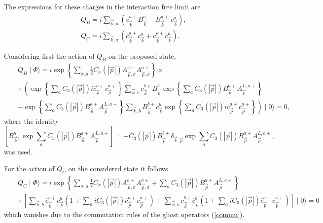 \documentclass[12pt,letterpaper]{report}
\begin{document}
The expressions for these charges in the interaction free limit
\cite{OjimaTex} are
\begin{eqnarray}
&&Q_B=i\sum\limits_{\vec{k},a}\left(
c_{\vec{k}}^{a+}B_{\vec{k}}^a-B_{\vec{k} }^{a+\
}c_{\vec{k}}^a\right), \nonumber \\
&&Q_C=i\sum\limits_{\vec{k},a}\left(
\overline{c}_{\vec{k}}^{a+}c_{\vec{k}
}^a+c_{\vec{k}}^{a+}\overline{c}_{\vec{k}}^a\right).
\end{eqnarray}

Considering first the action of $Q_B$ on the proposed state,
{\setlength\arraycolsep{0.5pt}
\begin{eqnarray}
&&Q_B\mid \Phi \rangle =i\exp \left\{ \sum\limits_{\sigma,a}\frac
12C_\sigma \left(\left| \vec{p}\right| \right) A_{\vec{p},\sigma
}^{a+}A_{\vec{p},\sigma }^{a+}\right\} \times \nonumber \\
&&\times \left(\exp \left\{ \sum\limits_aC_3\left(\left|
\vec{p}\right| \right)
i\overline{c}_{\vec{p}}^{a+}c_{\vec{p}}^{a+}\right\} \sum\limits_{
\vec{k},b}c_{\vec{k}}^{b+}B_{\vec{k}}^b\exp \left\{
\sum\limits_aC_3\left(\left| \vec{p}\right| \right)
B_{\vec{p}}^{a+}A_{\vec{p}}^{L,a+}\right\} \right. \\ &&-\left.
\exp \left\{ \sum\limits_aC_3\left(\left| \vec{p}\right| \right)
B_{\vec{p}}^{a+}A_{\vec{p}}^{L,a+}\right\}
\sum\limits_{\vec{k},b}B_{\vec{k} }^{b+}c_{\vec{k}}^b\exp \left\{
\sum\limits_aC_3\left(\left| \vec{p}\right| \right)
i\overline{c}_{\vec{p}}^{a+}c_{\vec{p}}^{a+}\right\} \right) \mid
0\rangle =0, \nonumber
\end{eqnarray}
}where the identity
\begin{equation}
\left[ B_{\vec{k}}^b,\exp \sum\limits_aC_3\left(\left|
\vec{p}\right| \right) B_{\vec{p}}^{a+}A_{\vec{p}}^{L,a+}\right]
=-C_3\left(\left| \vec{p} \right| \right) B_{\vec{p}}^{b+}\delta
_{\vec{k},\vec{p}}\exp \sum\limits_aC_3\left(\left| \vec{p}\right|
\right) B_{\vec{p}}^{a+}A_{\vec{ p}}^{L,a+}, \label{ident1}
\end{equation}
was used.

For the action of $Q_C$ on the considered state it follows
{\setlength\arraycolsep{0.1pt}
\begin{eqnarray}
&&Q_C\mid \Phi \rangle =i\exp \left\{ \sum\limits_{\sigma,a}\frac
12C_\sigma \left(\left| \vec{p}\right| \right)A_{\vec{p},\sigma
}^{a+}A_{\vec{p},\sigma }^{a+}+\sum\limits_aC_3\left(\left|
\vec{p}\right| \right) B_{\vec{p} }^{a+}A_{\vec{p}}^{L,a+}\right\}
\\ &&\times \left[ \sum\limits_{\vec{k},b}
\overline{c}_{\vec{k}}^{b+}c_{\vec{k} }^b\left(
1+\sum\limits_aiC_3\left(\left| \vec{p}\right| \right) \overline{
c }_{\vec{p}}^{a+}c_{\vec{p}}^{a+}\right)
+\sum\limits_{\vec{k},b}c_{\vec{k}
}^{b+}\overline{c}_{\vec{k}}^b\left(1+\sum\limits_aiC_3\left(
\left| \vec{p} \right| \right)
\overline{c}_{\vec{p}}^{a+}c_{\vec{p}}^{a+}\right) \right] \mid
0\rangle =0 \nonumber
\end{eqnarray}
}which vanishes due to the commutation rules of the ghost
operators (\ref {commu}).
\end{document}
